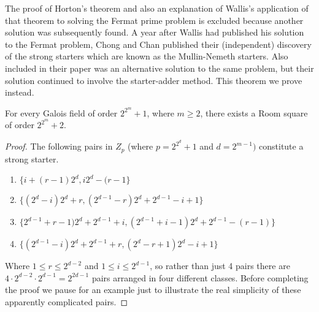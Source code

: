 The proof of Horton's theorem and also an explanation of Wallis's application of that theorem to solving the Fermat prime problem is excluded because another solution was subsequently found.
A year after Wallis had published his solution to the Fermat problem, Chong and Chan published their (independent) discovery of the strong starters which are known as the Mullin-Nemeth starters.
Also included in their paper was an alternative solution to the same problem, but their solution continued to involve the starter-adder method.
This theorem we prove instead.

\begin{theorem}
\label{thm:chong-chan}
For every Galois field of order $2^{2^m} + 1$, where $m \geq 2$, there exists a Room square of order $2^{2^m} + 2$.
\end{theorem}

\begin{proof}
The following pairs in $Z_p$ (where $p = 2^{2^d} + 1$ and $d = 2^{m - 1})$ constitute a strong starter.

\begin{enumerate}
  \item{$\{i + (r - 1)2^d, i2^d - (r - 1\}$}
  \item{$\{(2^d - i)2^d + r, (2^{d - 1} - r)2^d + 2^{d - 1} - i + 1\}$}
  \item{$\{2^{d-1} + r - 1)2^d + 2^{d - 1} + i, (2^{d - 1} + i - 1)2^d + 2^{d - 1} - (r - 1)\}$}
  \item{$\{(2^{d-1}-i)2^d+2^{d-1}+r,(2^d-r+1)2^d-i+1\}$}
\end{enumerate}

Where $1 \leq r \leq 2^{d - 2}$ and $1 \leq i \leq 2^{d-1}$, so rather than just 4 pairs there are $4 \cdot 2^{d - 2} \cdot 2^{d - 1} = 2^{2d - 1}$ pairs arranged in four different classes.
Before completing the proof we pause for an example just to illustrate the real simplicity of these apparently complicated pairs.
\end{proof}

